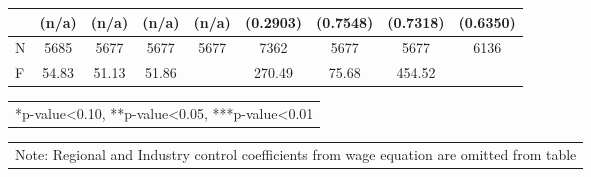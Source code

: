 \documentclass[12pt]{report}
\begin{document}
\begin{sidewaystable}
\begin{tabular}{lc|c|c|c|c|c|c|c}
& (n/a) & (n/a) & (n/a) & (n/a) & (0.2903) & (0.7548) & (0.7318) & (0.6350)\\
\hline
N & 5685 & 5677 & 5677 & 5677 & 7362 & 5677 & 5677 & 6136\\
F & 54.83 & 51.13 & 51.86 & & 270.49 & 75.68 & 454.52 & \\
\hline
\hline
\end{tabular}
\begin{tabular}{p{6.25in}}\footnotesize{
*p-value<0.10, **p-value<0.05, ***p-value<0.01}\\
\end{tabular}
\begin{tabular}{p{6.25in}}\footnotesize{
Note: Regional and Industry control coefficients from wage equation are omitted from table}\\
\end{tabular}
\end{sidewaystable}

\begin{comment}R-sq & 0.2400 & -0.0411 & -0.1651 & -0.1736 & 0.4031 & -1.0647 & -1.2210 & -1.2828\\
\end{comment}
\end{document}
